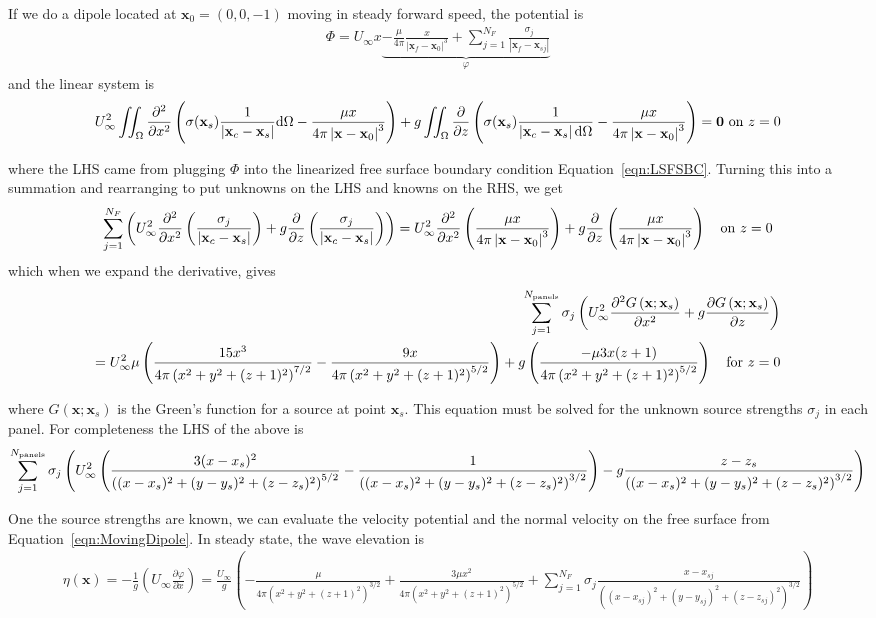 \documentclass[10pt]{article}
\newcommand{\pp}[2]{\frac{\partial #1}{\partial #2}}
\newcommand{\ppt}[2]{\frac{\partial^2 #1}{\partial #2^2}}
\newcommand{\mbf}[1]{\mathbf{#1}}
\newcommand{\be}{\begin{eqnarray}}
\newcommand{\ee}{\end{eqnarray}}
\newcommand{\ben}{\begin{eqnarray*}}
\newcommand{\een}{\end{eqnarray*}}
\newcommand{\beq}{\begin{equation}
    \begin{aligned}
        }
\newcommand{\eeq}{\end{aligned}
\end{equation}
}
\newcommand{\Uinf}{U_{\infty}}
\newcommand{\tn}[1]{\textnormal{#1}}
\begin{document}
If we do a dipole located at $\mbf{x}_0=(0,0,-1)$ moving in steady forward speed, the potential is
\be
\label{eqn:MovingDipole}
\Phi = \Uinf x
\underbrace{
-\frac{\mu}{4\pi}\frac{x}{ \left|\mbf{x}_f - \mbf{x}_0\right|^{3}} + \sum_{j=1}^{N_F} \frac{\sigma_j}{\left| \mbf{x}_f - \mbf{x}_{sj}\right|}
}_{\varphi}
\ee
and the linear system is
\beq
\Uinf^2  \iint_{\Omega}\ppt{   }{x}
\left(
\sigma(\mbf{x}_s) \frac{1}{\left| \mbf{x}_c - \mbf{x}_s\right|} \tn{d}\Omega
-\frac{\mu x }{4\pi \left| \mbf{x} - \mbf{x}_0\right|^{3}}
\right)
+ g
\iint_{\Omega} \pp{}{z}
\left(
\sigma(\mbf{x}_s) \frac{1}{\left| \mbf{x}_c - \mbf{x}_s  \right| \tn{d}\Omega}
-\frac{\mu x}{4\pi \left| \mbf{x} - \mbf{x}_0\right|^{3}}
\right)
=\mbf{0}
\tn{ on } z= 0
\eeq
where the LHS came from plugging $\Phi$ into the linearized free surface boundary condition Equation~\eqref{eqn:LSFSBC}.
Turning this into a summation and rearranging to put unknowns on the LHS and knowns on the RHS, we get
\ben
\sum_{j=1}^{N_F}
\left(
\Uinf^2
\ppt{   }{x}
\left(
    \frac{\sigma_j}{\left| \mbf{x}_c - \mbf{x}_s\right|}
    \right)
+ g
\pp{}{z}
\left(
    \frac{\sigma_j}{\left| \mbf{x}_c - \mbf{x}_s  \right| }
    \right)
\right)
=
\Uinf^2 \ppt{ }{x}
\left(
\frac{\mu x}{4\pi \left| \mbf{x} - \mbf{x}_0\right|^{3}}
\right)
+
g\pp{}{z}
\left(
\frac{\mu x}{4\pi \left| \mbf{x} - \mbf{x}_0\right|^{3}}
\right)
\quad \tn{on } z=0
\een
which when we expand the derivative, gives
\beq
\sum_{j=1}^{N_{\tn{panels}}}
\sigma_j
\left(
\Uinf^2
\ppt{G\left(\mbf{x}; \mbf{x}_s\right)}{x}
+ g\pp{G\left(\mbf{x}; \mbf{x}_s\right)}{z}
\right)
\\=
\Uinf^2 \mu\left(
\frac{15x^3}{4\pi \left(x^2 + y^2 + (z+1)^2\right)^{7/2}}
-\frac{9x}{4\pi \left(x^2 + y^2 + (z+1)^2\right)^{5/2}}
\right)
+ g
\left(
\frac{-\mu 3x(z+1)}{4\pi \left(x^2 + y^2 + (z+1)^2\right)^{5/2}}
\right) \quad \tn{for } z = 0
\eeq
where $G\left(\mbf{x}; \mbf{x}_s\right)$ is the Green's function for a source at point $\mbf{x}_s$.
This equation must be solved for the unknown source strengths $\sigma_j$ in each panel.
For completeness the LHS of the above is
\be
\sum_{j=1}^{N_{\tn{panels}}}
\sigma_j
\left(
\Uinf^2 \left( \frac{3 (x-x_s)^2}{\left((x-x_s)^2 + (y-y_s)^2 + (z-z_s)^2\right)^{5/2}}
    - \frac{1}{\left((x-x_s)^2 + (y-y_s)^2 + (z-z_s)^2\right)^{3/2}}
    \right)
-
g
\frac{z-z_s}{\left((x-x_s)^2 + (y-y_s)^2 + (z-z_s)^2\right)^{3/2}}
\right)
\ee

One the source strengths are known, we can evaluate the velocity potential and the normal velocity on the free surface from Equation~\eqref{eqn:MovingDipole}.
In steady state, the wave elevation is
\beq
\eta(\mbf{x}) = -\frac{1}{g}
\left(
\Uinf \pp{\varphi}{x}
\right)
=
\frac{\Uinf}{g}\left(
-\frac
    {\mu}{4\pi \left(x^2 + y^2 + (z+1)^2\right)^{3/2}}
+
\frac
    {3\mu x^2}
    {4\pi \left(x^2 + y^2 + (z+1)^2\right)^{5/2}}
+ \sum_{j=1}^{N_F}\sigma_j
\frac{x - x_{sj}}{\left( \left(x - x_{sj}\right)^2 + \left(y - y_{sj}\right)^2 + \left(z - z_{sj}\right)^2 \right)^{3/2} }
\right)
\eeq
\end{document}
